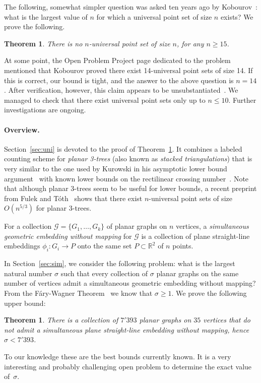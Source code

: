 \documentclass[11pt]{article}
\newtheorem{theorem}[equation]{Theorem}
\newcommand{\R}{\ensuremath{\mathds R}}
\begin{document}
The following, somewhat simpler question was asked ten years ago by
Kobourov~\cite{dmo-topp-}: what is the largest value of $n$ for which a
universal point set of size $n$ exists? We prove the following.
\begin{theorem}
\label{thm:main}
There is no $n$-universal point set of size $n$, for any $n\ge 15$.
\end{theorem}

At some point, the Open Problem Project page dedicated to the
problem~\cite{dmo-topp-} mentioned that Kobourov proved there exist 14-universal
point sets of size 14. If this is correct, our bound is tight, and the answer to
the above question is $n=14$. After verification, however, this claim appears to
be unsubstantiated~\cite{Kobourov}. We managed to check that there exist
universal point sets only up to $n\leq 10$. Further investigations are ongoing.

\paragraph{Overview.}
Section~\ref{sec:uni} is devoted to the proof of Theorem~\ref{thm:main}.  It
combines a labeled counting scheme for \emph{planar 3-trees} (also known as
\emph{stacked triangulations}) that is very similar to the one used by Kurowski
in his asymptotic lower bound argument~\cite{Kurowski04} with known lower bounds
on the rectilinear crossing number~\cite{AF05,lvww-cqk-04}.  Note that although
planar 3-trees seem to be useful for lower bounds, a recent preprint from Fulek
and T\'oth~\cite{FT12} shows that there exist $n$-universal point sets of size
$O(n^{5/3})$ for planar 3-trees.

For a collection $\mathcal G=\{G_1,\ldots,G_k\}$ of planar graphs on $n$
vertices, a \emph{simultaneous geometric embedding without mapping} for
$\mathcal G$ is a collection of plane straight-line embeddings $\phi_i:G_i\to
P$ onto the same set $P\subset\R^2$ of $n$ points.

In Section~\ref{sec:sim}, we consider the following problem: what is the largest
natural number $\sigma$ such that every collection of $\sigma$ planar graphs on
the same number of vertices admit a simultaneous geometric embedding without
mapping? From the F\'ary-Wagner Theorem~\cite{f-slrpg-48,w-bzv-36} we know that
$\sigma\ge 1$.  We prove the following upper bound:
\begin{theorem}\label{thm:sim}
  There is a collection of $7'393$ planar graphs on $35$ vertices that do not
  admit a simultaneous plane straight-line embedding without mapping, hence
  $\sigma < 7'393$.
\end{theorem}
To our knowledge these are the best bounds currently known. It is a very
interesting and probably challenging open problem to determine the exact value
of~$\sigma$.
\end{document}
